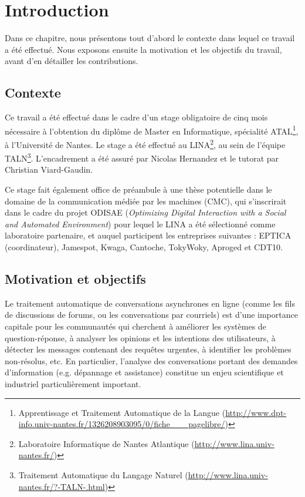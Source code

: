 
\chapter{Introduction}

\label{ch:introduction}

Dans ce chapitre, nous présentons tout d'abord le contexte dans lequel ce travail a été effectué. Nous exposons ensuite la motivation et les objectifs du travail, avant d'en détailler les contributions.

\section{Contexte}

Ce travail a été effectué dans le cadre d'un stage obligatoire de cinq mois nécessaire à l'obtention du diplôme de Master en Informatique, spécialité ATAL\footnote{Apprentissage et Traitement Automatique de la Langue (\url{http://www.dpt-info.univ-nantes.fr/1326208903095/0/fiche___pagelibre/})}, à l'Université de Nantes. Le stage a été effectué au LINA\footnote{Laboratoire Informatique de Nantes Atlantique (\url{http://www.lina.univ-nantes.fr/})}, au sein de l'équipe TALN\footnote{Traitement Automatique du Langage Naturel (\url{http://www.lina.univ-nantes.fr/?-TALN-.html})}. L'encadrement a été assuré par Nicolas Hernandez et le tutorat par Christian Viard-Gaudin.

Ce stage fait également office de préambule à une thèse potentielle dans le domaine de la communication médiée par les machines (CMC), qui s'inscrirait dans le cadre du projet ODISAE (\textit{Optimizing Digital Interaction with a Social and Automated Environment}) pour lequel le LINA a été sélectionné comme laboratoire partenaire, et auquel participent les entreprises suivantes : EPTICA (coordinateur), Jamespot, Kwaga, Cantoche, TokyWoky, Aproged et CDT10.

\section{Motivation et objectifs}

Le traitement automatique de conversations asynchrones en ligne (comme les fils de discussions de forums, ou les conversations par courriels) est d'une importance capitale pour les communautés qui cherchent à améliorer les systèmes de question-réponse, à analyser les opinions et les intentions des utilisateurs, à détecter les messages contenant des requêtes urgentes, à identifier les problèmes non-résolus, etc. En particulier, l'analyse des conversations portant des demandes d'information (e.g. dépannage et assistance) constitue un enjeu scientifique et industriel particulièrement important.

